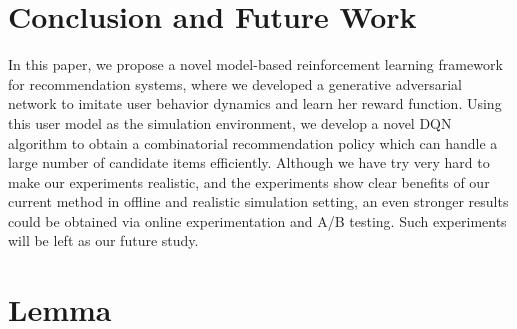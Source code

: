 \documentclass{article} %
\begin{document}
\vspace{-3mm}
\section{Conclusion and Future Work}
\vspace{-3mm}

 In this paper, we propose a novel model-based reinforcement learning framework for recommendation systems, where we developed a generative adversarial network to imitate user behavior dynamics and learn her reward function. Using this user model as the simulation environment, we develop a novel DQN algorithm to obtain a combinatorial recommendation policy which can handle a large number of candidate items efficiently. Although we have try very hard to make our experiments realistic, and the experiments show clear benefits of our current method in offline and realistic simulation setting, an even stronger results could be obtained via online experimentation and A/B testing. Such experiments will be left as our future study.

\newpage



\newpage

\appendix
\section{Lemma}\label{app:proof}
\end{document}
